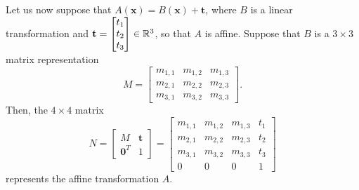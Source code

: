 \documentclass[letterpaper]{article}
\begin{document}
Let us now suppose that $A(\mathbf{x}) = B(\mathbf{x}) + \mathbf{t}$, where $B$ is a linear transformation and $\mathbf{t} = \begin{bmatrix}
    t_1 \\ t_2 \\ t_3
\end{bmatrix} \in \mathbb{R}^3$, so that $A$ is affine. Suppose that $B$ is a $3 \times 3$ matrix representation
\[M = \begin{bmatrix}
    m_{1,1} & m_{1,2} & m_{1,3} \\ 
    m_{2,1} & m_{2,2} & m_{2,3} \\ 
    m_{3,1} & m_{3,2} & m_{3,3} 
\end{bmatrix}.\]
Then, the $4 \times 4$ matrix 
\[N = \begin{bmatrix}
    M & \mathbf{t} \\ 
    \mathbf{0}^T & 1
\end{bmatrix} = \begin{bmatrix}
    m_{1,1} & m_{1,2} & m_{1,3} & t_1 \\ 
    m_{2,1} & m_{2,2} & m_{2,3} & t_2 \\ 
    m_{3,1} & m_{3,2} & m_{3,3} & t_3 \\ 
    0 & 0 & 0 & 1
\end{bmatrix}\]
represents the affine transformation $A$.
\end{document}
